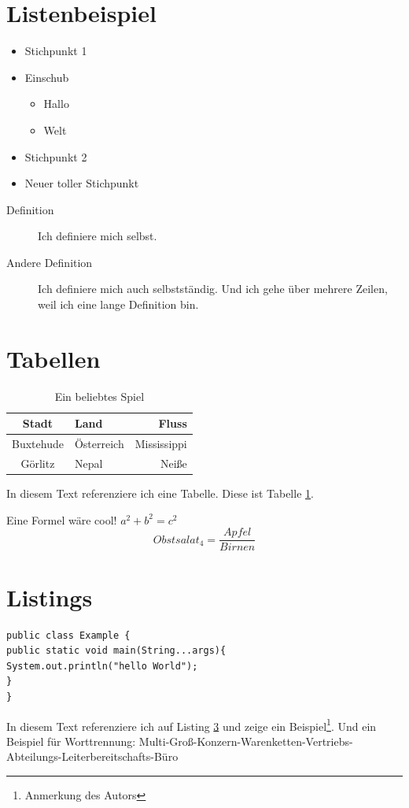 \documentclass[]{scrreprt}
\begin{document}
\section{Listenbeispiel}

\begin{itemize}
\item Stichpunkt 1
\item Einschub
\begin{itemize}
\item Hallo
\item Welt
\end{itemize}

\item Stichpunkt 2
\item Neuer toller Stichpunkt
\end{itemize}

\begin{description}
\item [Definition] Ich definiere mich selbst.
\item [Andere Definition] Ich definiere mich auch selbstständig. Und ich gehe über mehrere Zeilen, weil ich eine lange Definition bin.
\end{description}

\section{Tabellen}
\begin{table}[h]
\centering
\begin{tabular}{|c||l|r|}
\hline
Stadt & Land & Fluss \\
\hline
Buxtehude & Österreich & Mississippi\\
\hline
Görlitz & Nepal & Neiße\\
\hline
\end{tabular}
\caption{Ein beliebtes Spiel}
\label{tab:stadt}
\end{table}

In diesem Text referenziere ich eine Tabelle. Diese ist Tabelle \ref{tab:stadt}.

Eine Formel wäre cool! $a^2 + b^2 = c^2$
\[ Obstsalat_4 = \frac{Apfel}{Birnen} \]

\section{Listings}%
\label{meinCode}%
\begin{lstlisting}[caption=Example]
public class Example {
public static void main(String...args){
System.out.println("hello World");
}
}
\end{lstlisting}


In diesem Text referenziere ich auf Listing \ref{meinCode} und zeige ein Beispiel\footnote{Anmerkung des Autors}. Und ein Beispiel für Worttrennung: Multi-Groß-Konzern-Warenketten-Vertriebs-Abteilungs-Leiterbereit\-schafts-Büro
\end{document}
